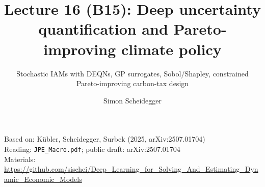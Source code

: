 \documentclass[aspectratio=169,11pt]{beamer}
\title[Lecture 16 (B15)]{Lecture 16 (B15): Deep uncertainty quantification and Pareto-improving climate policy}
\subtitle{Stochastic IAMs with DEQNs, GP surrogates, Sobol/Shapley, constrained Pareto-improving carbon-tax design}
\author{Simon Scheidegger}
\institute{HEC, University of Lausanne}
\date{}
\begin{document}
\newcommand{\exercisepause}{%
  \tikz[baseline=(X.base)]{\node[fill=darkgreen!80!black, text=white,
  rounded corners=2pt, inner sep=3pt, font=\scriptsize\bfseries](X){PAUSE --- 5 min};}}



{
\begin{frame}
\titlepage
\vspace{-0.4cm}
\begin{center}
{\footnotesize Based on: K\"ubler, Scheidegger, Surbek (2025, arXiv:2507.01704)}\\[2pt]
{\footnotesize Reading: \texttt{JPE\_Macro.pdf}; public draft: arXiv:2507.01704}\\[4pt]
{\footnotesize Materials: \url{https://github.com/sischei/Deep_Learning_for_Solving_And_Estimating_Dynamic_Economic_Models}}
\end{center}
\end{frame}
}
\end{document}
